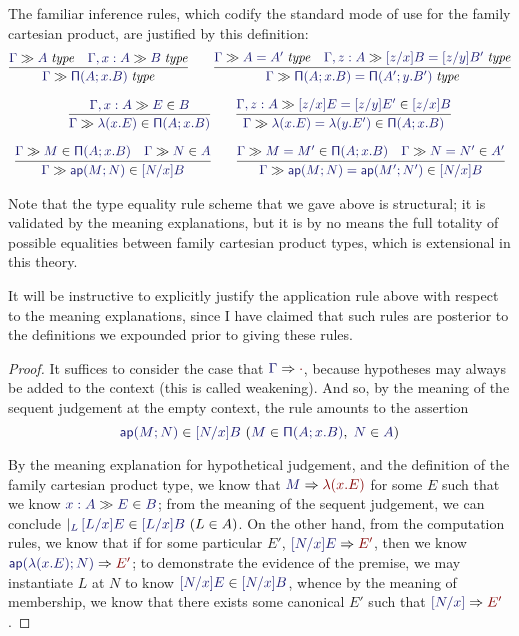 \documentclass[main.tex]{subfiles}
\begin{document}
The familiar inference rules, which codify the standard mode of use for the
family cartesian product, are justified by this definition:
\begin{gather*}
  \infer{
    \sequent\Gamma\isset{\typrod{A}{x}{B}}
  }{
    \sequent\Gamma\isset{A} &
    \sequent{\Gamma,x:A}{\isset{B}}
  }\qquad
  \infer{
    \sequent\Gamma\isset{\typrod{A}{x}{B}=\typrod{A'}{y}{B'}}
  }{
   \sequent\Gamma\isset{A=A'} &
    \sequent{\Gamma,z:A}{\isset{[z/x]B=[z/y]B'}}
  }\\[6pt]
  \infer{
    \sequent\Gamma\ver{\lam{x}{E}}{\typrod{A}{x}{B}}
  }{
    \sequent{\Gamma,x:A}{\ver{E}{B}}
  }\qquad
  \infer{
    \sequent\Gamma\ver{\lam{x}{E}=\lam{y}{E'}}{\typrod{A}{x}{B}}
  }{
    \sequent{\Gamma,z:A}{\ver{[z/x]E=[z/y]E'}{[z/x]B}}
  }\\[6pt]
  \infer{
    \sequent\Gamma\ver{\ap{M}{N}}{[N/x]B}
  }{
    \sequent\Gamma\ver{M}{\typrod{A}{x}{B}} &
    \sequent\Gamma\ver{N}{A}
  }\qquad
  \infer{
    \sequent\Gamma\ver{\ap{M}{N}=\ap{M'}{N'}}{[N/x]B}
  }{
    \sequent\Gamma\ver{M=M'}{\typrod{A}{x}{B}} &
    \sequent\Gamma\ver{N=N'}{A'}
  }
\end{gather*}

Note that the type equality rule scheme that we gave above is structural; it is
validated by the meaning explanations, but it is by no means the full totality
of possible equalities between family cartesian product types, which is
extensional in this theory.

It will be instructive to explicitly justify the application rule above with
respect to the meaning explanations, since I have claimed that such rules are
posterior to the definitions we expounded prior to giving these rules.

\begin{proof}
It suffices to consider the case that $\reduce{\Gamma}{\cdot}$,
because hypotheses may always be added to the context (this is called
weakening). And so, by the meaning of the sequent judgement at the
empty context, the rule amounts to the assertion
\[
  \hyp{
    \ver{\ap{M}{N}}{[N/x]B}
  }{
    \ver{M}{\typrod{A}{x}{B}},\; \ver{N}{A}
  }
\]

By the meaning explanation for hypothetical judgement, and the
definition of the family cartesian product type, we know that
$\reduce{M}{\lam{x}{E}}$ for some $E$ such that we know
$\sequent{x:A}{\ver{E}{B}}$; from the meaning of the sequent
judgement, we can conclude $\genj{L}{\hyp{\ver{[L/x]E}{[L/x]B}}{L\in
A}}$. On the other hand, from the computation rules, we know that if
for some particular $E'$, $\reduce{[N/x]E}{E'}$, then we know
$\reduce{\ap{\lam{x}{E}}{N}}{E'}$; to demonstrate the evidence of the
premise, we may instantiate $L$ at $N$ to know $\ver{[N/x]E}{[N/x]B}$,
whence by the meaning of membership, we know that there exists some
canonical $E'$ such that $\reduce{[N/x]}{E'}$.
\end{proof}
\end{document}
